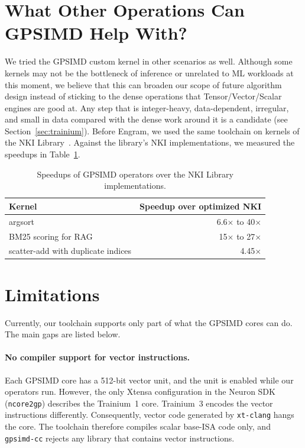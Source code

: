\documentclass{article}
\newcommand{\code}[1]{\texttt{#1}}
\begin{document}
\section{What Other Operations Can GPSIMD Help With?}
\label{sec:other}

We tried the GPSIMD custom kernel in other scenarios as well. Although some kernels may not be the bottleneck of inference or unrelated to ML workloads at this moment, we believe that this can broaden our scope of future algorithm design instead of sticking to the dense operations that Tensor/Vector/Scalar engines are good at. Any step that is integer-heavy, data-dependent, irregular, and small in data compared with the dense work around it is a candidate (see Section~\ref{sec:trainium}). Before Engram, we used the same toolchain on kernels of the NKI Library~\citep{nki_library}. Against the library's NKI implementations, we measured the speedups in Table~\ref{tab:other}.

\begin{table}[h]
  \centering
  \caption{Speedups of GPSIMD operators over the NKI Library implementations.}
  \label{tab:other}
  \small
  \begin{tabular}{lr}
    \toprule
    \textbf{Kernel} & \textbf{Speedup over optimized NKI} \\
    \midrule
    argsort & 6.6$\times$ to 40$\times$ \\
    BM25 scoring for RAG & 15$\times$ to 27$\times$ \\
    scatter-add with duplicate indices & 4.45$\times$ \\
    \bottomrule
  \end{tabular}
\end{table}

\section{Limitations}
\label{sec:limitations}

Currently, our toolchain supports only part of what the GPSIMD cores can do. The main gaps are listed below.

\paragraph{No compiler support for vector instructions.} Each GPSIMD core has a 512-bit vector unit, and the unit is enabled while our operators run. However, the only Xtensa configuration in the Neuron SDK (\code{ncore2gp}) describes the Trainium~1 core. Trainium~3 encodes the vector instructions differently. Consequently, vector code generated by \code{xt-clang} hangs the core. The toolchain therefore compiles scalar base-ISA code only, and \code{gpsimd-cc} rejects any library that contains vector instructions.
\end{document}
